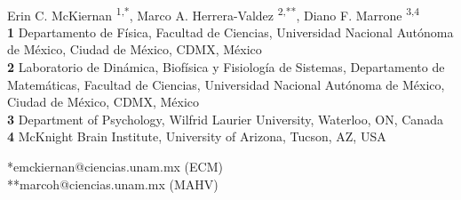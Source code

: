 \documentclass[10pt,letterpaper]{article}
\begin{document}
\vspace*{0.2in}

\begin{flushleft}
{\Large
\textbf{} %
}
\newline
\\
Erin C. McKiernan \textsuperscript{1,*},
Marco A. Herrera-Valdez \textsuperscript{2,**},
Diano F. Marrone \textsuperscript{3,4}
\\
\bigskip
\textbf{1} Departamento de F\'isica, Facultad de Ciencias, Universidad Nacional Aut\'onoma de M\'exico, Ciudad de México, CDMX, México
\\
\textbf{2} Laboratorio de Din\'amica, Biof\'isica y Fisiolog\'ia de Sistemas, Departamento de Matem\'aticas, Facultad de Ciencias, Universidad Nacional Aut\'onoma de M\'exico, Ciudad de México, CDMX, México
\\
\textbf{3} Department of Psychology, Wilfrid Laurier University, Waterloo, ON, Canada
\\
\textbf{4} McKnight Brain Institute, University of Arizona, Tucson, AZ, USA
\\
\bigskip

*emckiernan@ciencias.unam.mx (ECM) \\
**marcoh@ciencias.unam.mx (MAHV)

\end{flushleft}
\end{document}
